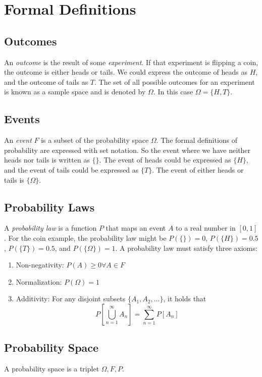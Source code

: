 \section{Formal Definitions}

\subsection{Outcomes}
An \emph{outcome} is the result of some \emph{experiment}.
If that experiment is flipping a coin, the outcome is either
heads or tails. We could express the outcome of heads as $H$,
and the outcome of tails as $T$. The set of all possible
outcomes for an experiment is known as a sample space and is
denoted by $\Omega$. In this case $\Omega = \{H, T\}$.

\subsection{Events}
An \emph{event} $F$ is a subset of the probability space $\Omega$.
The formal definitions of probability are expressed with set
notation. So the event where we have neither heads nor tails is
written as $\{\}$. The event of heads could be expressed as
$\{H\}$, and the event of tails could be expressed as $\{T\}$.
The event of either heads or tails is $\{\Omega\}$.

\subsection{Probability Laws}
A \emph{probability law} is a function $P$ that maps an event $A$
to a real number in $[0, 1]$. For the coin example, the probability
law might be $P(\{\}) = 0$, $P(\{H\}) = 0.5$, $P(\{T\}) = 0.5$, and
$P(\{\Omega\}) = 1$. A probability law must satisfy three axioms:
\begin{enumerate}
    \item Non-negativity: $P(A) \geq 0 \forall A \in F$
    \item Normalization: $P(\Omega) = 1$
    \item Additivity: For any disjoint subsets $\{A_1, A_2, \dots\}$,
          it holds that
          \[P\left[\bigcup_{n=1}^{\infty}A_n\right] = \sum_{n=1}^{\infty}P\left[A_n\right]\]
\end{enumerate}

\subsection{Probability Space}
A probability space is a triplet $\Omega, F, P$.

